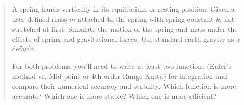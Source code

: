 \documentclass{article}
\begin{document}
\begin{quote}
A spring hands vertically in its equilibrium or resting position. Given a
user-defined mass $m$ attached to the spring with spring constant $k$, not
stretched at first. Simulate the motion of the spring and mass under the effects
of spring and gravitational forces. Use standard earth gravity as a default. 

For both problems, you'll need to write at least two functions (Euler's method 
vs. Mid-point or 4th order Runge-Kutta) for integration and compare their 
numerical accuracy and stability. Which function is more accurate? 
Which one is more stable? Which one is more efficient?
\end{quote}
\end{document}
